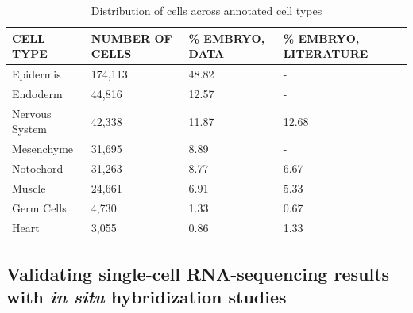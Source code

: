 \begin{small}
    \begin{table}[ht]
        \centering
        \caption{Distribution of cells across annotated cell types} 
        \begin{tabular}{|p{}|p{}|p{}|p{}|}
            \hline
            \textbf{CELL TYPE} & \textbf{NUMBER OF CELLS} & \textbf{\% EMBRYO, DATA} & \textbf{\% EMBRYO, LITERATURE} \\ \hline 
            
            Epidermis & 174,113 & 48.82	& - \\
            Endoderm & 44,816 & 12.57 & - \\
            Nervous System & 42,338 & 11.87 & 12.68 \\
            Mesenchyme & 31,695 & 8.89 & - \\
            Notochord & 31,263 & 8.77 & 6.67 \\
            Muscle & 24,661 & 6.91 & 5.33 \\
            Germ Cells & 4,730 & 1.33 & 0.67 \\
            Heart & 3,055 & 0.86 & 1.33 \\
            \hline
        \end{tabular}
        \label{tab:single-cell proportion of cells}
    \end{table}
\end{small}		

\subsection{Validating single-cell RNA-sequencing results with \textit{in situ} hybridization studies}


